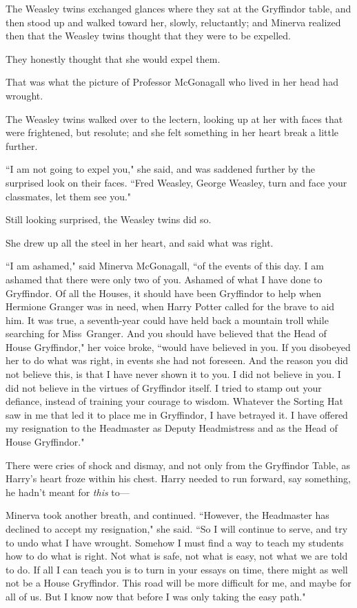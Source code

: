 The Weasley twins exchanged glances where they sat at the Gryffindor table, and then stood up and walked toward her, slowly, reluctantly; and Minerva realized then that the Weasley twins thought that they were to be expelled.

They honestly thought that she would expel them.

That was what the picture of Professor McGonagall who lived in her head had wrought.

The Weasley twins walked over to the lectern, looking up at her with faces that were frightened, but resolute; and she felt something in her heart break a little further.

``I am not going to expel you," she said, and was saddened further by the surprised look on their faces. ``Fred Weasley, George Weasley, turn and face your classmates, let them see you."

Still looking surprised, the Weasley twins did so.

She drew up all the steel in her heart, and said what was right.

``I am ashamed," said Minerva McGonagall, ``of the events of this day. I am ashamed that there were only two of you. Ashamed of what I have done to Gryffindor. Of all the Houses, it should have been Gryffindor to help when Hermione Granger was in need, when Harry Potter called for the brave to aid him. It was true, a seventh-year could have held back a mountain troll while searching for Miss~Granger. And you should have believed that the Head of House Gryffindor," her voice broke, ``would have believed in you. If you disobeyed her to do what was right, in events she had not foreseen. And the reason you did not believe this, is that I have never shown it to you. I did not believe in you. I did not believe in the virtues of Gryffindor itself. I tried to stamp out your defiance, instead of training your courage to wisdom. Whatever the Sorting Hat saw in me that led it to place me in Gryffindor, I have betrayed it. I have offered my resignation to the Headmaster as Deputy Headmistress and as the Head of House Gryffindor."

\later

There were cries of shock and dismay, and not only from the Gryffindor Table, as Harry's heart froze within his chest. Harry needed to run forward, say something, he hadn't meant for \emph{this} to—

\later

Minerva took another breath, and continued. ``However, the Headmaster has declined to accept my resignation," she said. ``So I will continue to serve, and try to undo what I have wrought. Somehow I must find a way to teach my students how to do what is right. Not what is safe, not what is easy, not what we are told to do. If all I can teach you is to turn in your essays on time, there might as well not be a House Gryffindor. This road will be more difficult for me, and maybe for all of us. But I know now that before I was only taking the easy path."

